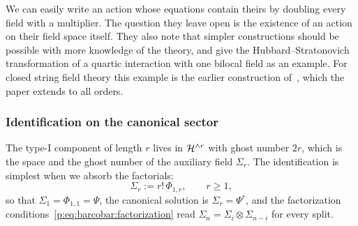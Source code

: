 We can easily write an action whose equations contain theirs by doubling every field with a multiplier. The question they leave open is the existence of an action on their field space itself.
They also note that simpler constructions should be possible with more knowledge of the theory, and give the Hubbard--Stratonovich transformation of a quartic interaction with one bilocal field as an example.
For closed string field theory this example is the earlier construction of~\cite{Erbin:2018:CubicClosedString}, which the paper extends to all orders.

\subsubsection{Identification on the canonical sector}
\label{p:sec:barcobar:canonical}

The type-I component of length $r$ lives in $\mathcal{H}^{\wedge r}$ with ghost number $2 r$, which is the space and the ghost number of the auxiliary field $\Sigma_r$.
The identification is simplest when we absorb the factorials:
\begin{equation}
  \label{p:eq:barcobar:identification}
  \Sigma_r
    := r! \, \Phi_{1, r},
  \qquad
  r \ge 1,
\end{equation}
so that $\Sigma_1 = \Phi_{1, 1} = \Psi$, the canonical solution is $\Sigma_r = \Psi^r$, and the factorization conditions~\eqref{p:eq:barcobar:factorization} read $\Sigma_n = \Sigma_i \otimes \Sigma_{n-i}$ for every split.
